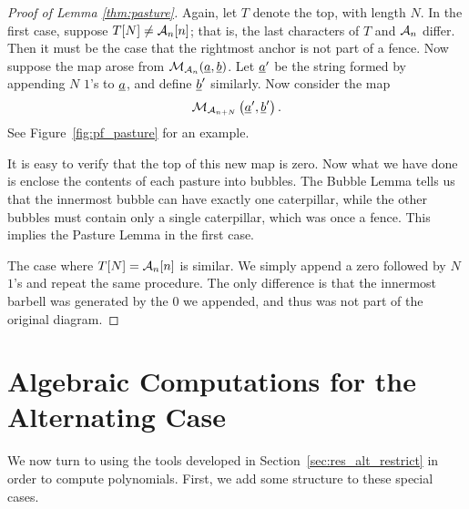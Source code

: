 \begin{proof}[Proof of Lemma \ref{thm:pasture}]
	Again, let $T$ denote the top, with length $N$.  In the first case, suppose $T[N] \neq \AA_n[n]$; that is, the last characters of $T$ and $\AA_n$ differ.  Then it must be the case that the rightmost anchor is not part of a fence.
	Now suppose the map arose from $\MM_{\AA_n}(\ul a, \ul b)$.  Let $\ul a'$ be the string formed by appending $N$ $1$'s to $\ul a$, and define $\ul b'$ similarly.  Now consider the map \[ \MM_{\AA_{n+N}} \left( \ul a', \ul b' \right). \]  See Figure~\ref{fig:pf_pasture} for an example.

	It is easy to verify that the top of this new map is zero.  Now what we have done is enclose the contents of each pasture into bubbles.  The Bubble Lemma tells us that the innermost bubble can have exactly one caterpillar, while the other bubbles must contain only a single caterpillar, which was once a fence.  This implies the Pasture Lemma in the first case.

	The case where $T[N] = \AA_n[n]$ is similar.  We simply append a zero followed by $N$ $1$'s and repeat the same procedure.  The only difference is that the innermost barbell was generated by the $0$ we appended, and thus was not part of the original diagram.
\end{proof}


\section{Algebraic Computations for the Alternating Case}
\label{sec:res_alt_compute}
We now turn to using the tools developed in Section~\ref{sec:res_alt_restrict} in order to compute polynomials. First, we add some structure to these special cases.

